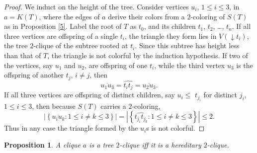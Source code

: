 \documentclass[12pt]{amsart}
\theoremstyle{plain}
\newtheorem{proposition}[theorem]{Proposition}
\numberwithin{equation}{section}
\begin{document}
\begin{proof}
We induct on the height of the tree. Consider vertices $u_{i}$, $1\leq i\leq
3$, in $a=K\left(  T\right)  $, where the edges of $a$ derive their colors from
a $2$-coloring of $S\left(  T\right)  $ as in Proposition \ref{5}. Label the
root of $T$ as $t_{0}$, and its children $t_{1}$, $t_{2}$, \ldots, $t_{n}$. If
all three vertices are offspring of a single $t_{i}$, the triangle they form
lies in $V\left(  \downarrow\!t_{i}\right)  $, the tree $2$-clique of the
subtree rooted at $t_{i}$. Since this subtree has height less than that of $T$,
the triangle is not colorful by the induction hypothesis. If two of the
vertices, say $u_{1}$ and $u_{2}$, are offspring of one $t_{i}$, while the
third vertex $u_{3}$ is the offspring of another $t_{j}$, $i\neq j$, then
\begin{displaymath}
    \overline{u_{1}u_{3}}=\widehat{t_{i}t_{j}}=\overline{u_{2}u_{3}}.
\end{displaymath}
If all three vertices are offspring of distinct children, say $u_{i}\leq$
$t_{j_{i}}$ for distinct $j_{i}$, $1\leq i\leq3$, then because $S\left(
T\right)  $ carries a $2$-coloring,
\begin{displaymath}
    \left\vert \left\{  \overline{u_{i}u_{k}}:1\leq i\neq k\leq3\right\}
    \right\vert =\left\vert \left\{  \widehat{t_{j_{i}}t_{j_{k}}}:1\leq i\neq
    k\leq3\right\}  \right\vert \leq2.
\end{displaymath}
Thus in any case the triangle formed by the $u_{i}$s is not colorful.
\end{proof}

\begin{proposition}
\label{6}A clique $a$ is a tree $2$-clique iff it is a hereditary $2$-clique.
\end{proposition}
\end{document}
